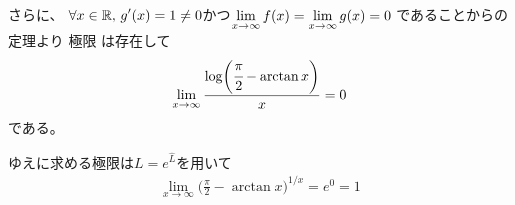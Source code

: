 \begin{ans*}
\begin{enumerate}[label=(\arabic*)]
    さらに、
    $\displaystyle\forall x\in\mathbb{R},\,\displaystyle g'(x) = 1 \neq 0$かつ$\displaystyle \lim_{x\to\infty}f(x) = \lim_{x\to\infty}g(x) = 0$
    であることから\lhopital の定理より
    極限
    は存在して
    \begin{gather}
      \lim_{x\to\infty}\frac{\log\biggl( \cfrac{\pi}{2} - \arctan x \biggr)}{x}
      = 0
    \end{gather}
    である。

    ゆえに求める極限は$L = e^{\hat{L}}$を用いて
    \begin{align}
      \lim_{x\to\infty}\biggl( \frac{\pi}{2} - \arctan x \biggr)^{1/x}
      = e^0 = 1
    \end{align}
  \end{enumerate}
\end{ans*}

